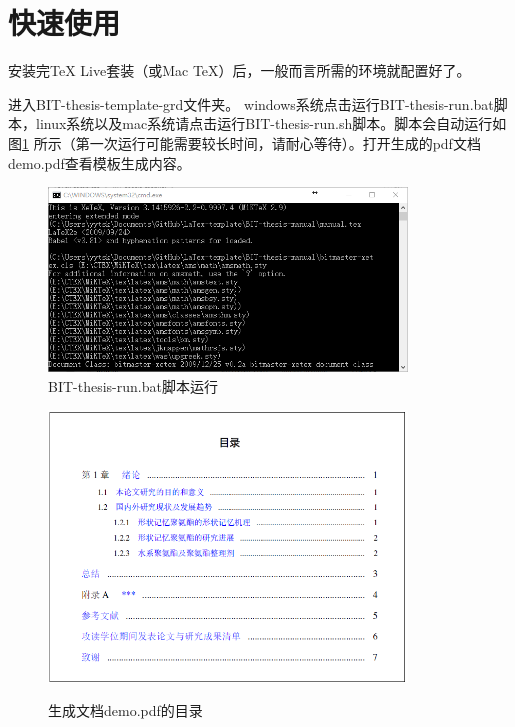\section{快速使用}
\label{sec:process}

安装完TeX Live套装（或Mac TeX）后，一般而言所需的环境就配置好了。

进入BIT-thesis-template-grd文件夹。
windows系统点击运行BIT-thesis-run.bat脚本，linux系统以及mac系统请点击运行BIT-thesis-run.sh脚本。脚本会自动运行如图\ref{fig:run} 所示（第一次运行可能需要较长时间，请耐心等待）。打开生成的pdf文档demo.pdf查看模板生成内容。
 
\begin{figure}[!htp]
  \centering
  \includegraphics[width=0.85\textwidth]{figures/BIT-thesis-run}
  \caption{BIT-thesis-run.bat脚本运行}
  \label{fig:run}
\end{figure}


\begin{figure}[!htp]
  \centering
  {\includegraphics[width=0.85\textwidth]{figures/demo_context}}
  \caption{生成文档demo.pdf的目录}
  \label{fig:demo_context}
\end{figure}

